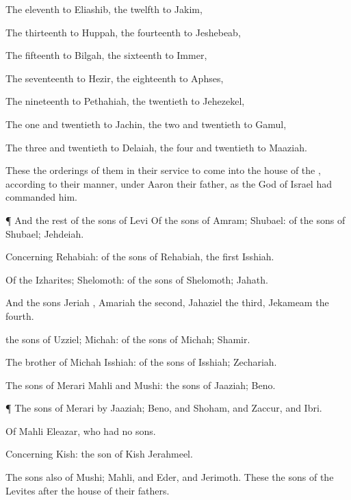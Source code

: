 {The
eleventh to
Eliashib, the
twelfth to
Jakim,

The
thirteenth to
Huppah, the
fourteenth to
Jeshebeab,

The
fifteenth to
Bilgah, the
sixteenth to
Immer,

The
seventeenth to
Hezir, the
eighteenth to
Aphses,

The
nineteenth to
Pethahiah, the
twentieth to
Jehezekel,

The
one and
twentieth to
Jachin, the
two and
twentieth to
Gamul,

The
three and
twentieth to
Delaiah, the
four and
twentieth to
Maaziah.

These
{} the
orderings of them in their
service to
come into the
house of the
{}, according to their
manner,
under
Aaron their
father, as the
{}
God of
Israel had
commanded him.


\par }{\PP {}¶ And the
rest of the
sons of
Levi
{} Of the
sons of
Amram;
Shubael: of the
sons of
Shubael;
Jehdeiah.

Concerning
Rehabiah: of the
sons of
Rehabiah, the
first
{}
Isshiah.

Of the
Izharites;
Shelomoth: of the
sons of
Shelomoth;
Jahath.

And the
sons
{}
Jeriah
{},
Amariah the
second,
Jahaziel the
third,
Jekameam the
fourth.

 the
sons of
Uzziel;
Michah: of the
sons of
Michah;
Shamir.

The
brother of
Michah
{}
Isshiah: of the
sons of
Isshiah;
Zechariah.

The
sons of
Merari
{}
Mahli and
Mushi: the
sons of
Jaaziah;
Beno.


\par }{\PP {}¶ The
sons of
Merari by
Jaaziah;
Beno, and
Shoham, and
Zaccur, and
Ibri.

Of
Mahli
{}
Eleazar, who had no
sons.

Concerning
Kish: the
son of
Kish
{}
Jerahmeel.

The
sons also of
Mushi;
Mahli, and
Eder, and
Jerimoth. These
{} the
sons of the
Levites after the
house of their
fathers.

}
